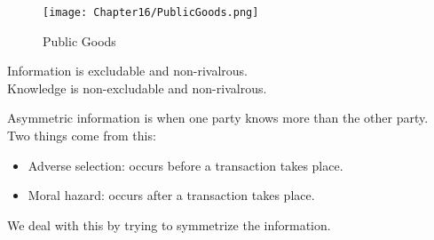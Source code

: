 \begin{figure}[H]
    \centering
    \texttt{[image: Chapter16/PublicGoods.png]}
    \caption{Public Goods}
    \label{fig:publicgoods}
\end{figure}
Information is excludable and non-rivalrous.\\
Knowledge is non-excludable and non-rivalrous.
\par
Asymmetric information is when one party knows more than the other party.\\
Two things come from this:
\begin{itemize}
    \item Adverse selection: occurs before a transaction takes place. 
    \item Moral hazard: occurs after a transaction takes place.
\end{itemize}
We deal with this by trying to symmetrize the information.